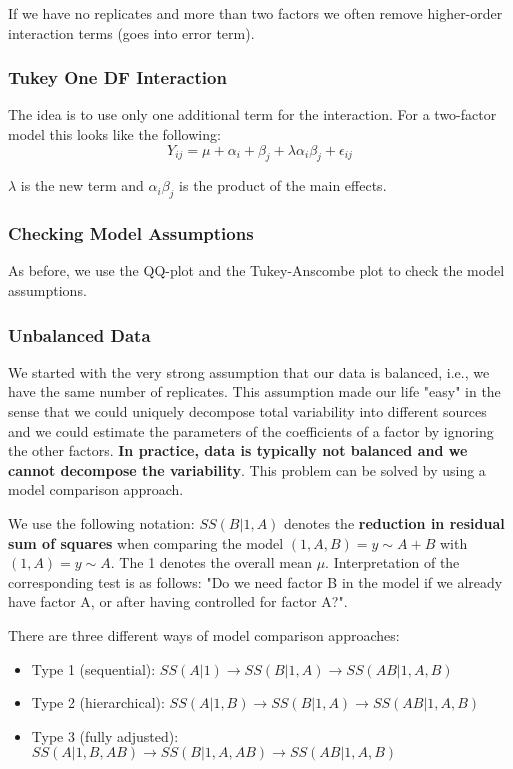 If we have no replicates and more than two factors we often remove higher-order interaction terms (goes into error term).

\subsubsection{Tukey One DF Interaction}

The idea is to use only one additional term for the interaction. For a two-factor model this looks like the following:
$$Y_{ij} = \mu + \alpha_i + \beta_j + \lambda \alpha_i \beta_j + \epsilon_{ij}$$

$\lambda$ is the new term and $\alpha_i \beta_j$ is the product of the main effects.

\subsubsection{Checking Model Assumptions}

As before, we use the QQ-plot and the Tukey-Anscombe plot to check the model assumptions.

\subsubsection{Unbalanced Data}

We started with the very strong assumption that our data is balanced, i.e., we have the same number of replicates. This assumption made our life "easy" in the sense that we could uniquely decompose total variability into different sources and we could estimate the parameters of the coefficients of a factor by ignoring the other factors. \textbf{In practice, data is typically not balanced and we cannot decompose the variability}. This problem can be solved by using a model comparison approach. \medskip

We use the following notation: $SS( B | 1, A)$ denotes the \textbf{reduction in residual sum of squares} when comparing the model $(1, A, B) = y \sim A + B$ with $(1, A) = y \sim A$. The 1 denotes the overall mean $\mu$. Interpretation of the corresponding test is as follows: "Do we need factor B in the model if we already have factor A, or after having controlled for factor A?". \medskip

There are three different ways of model comparison approaches:
\begin{itemize}
	\item Type 1 (sequential): $SS(A | 1) \to SS(B | 1, A) \to SS(AB | 1, A, B)$
	\item Type 2 (hierarchical): $SS(A | 1, B) \to SS(B | 1, A) \to SS(AB | 1, A, B)$
	\item Type 3 (fully adjusted): $SS(A | 1, B, AB) \to SS(B | 1, A, AB) \to SS(AB | 1, A, B)$
\end{itemize}

